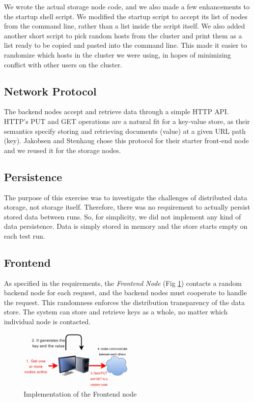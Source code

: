 \documentclass[11pt,conference]{IEEEtran}
\begin{document}
We wrote the actual storage node code, and we also made a few enhancements to
the startup shell script. We modified the startup script to accept its list of
nodes from the command line, rather than a list inside the script itself. We
also added another short script to pick random hosts from the cluster and print
them as a list ready to be copied and pasted into the command line. This made it
easier to randomize which hosts in the cluster we were using, in hopes of
minimizing conflict with other users on the cluster.


\subsection{Network Protocol}

The backend nodes accept and retrieve data through a simple HTTP API. HTTP's PUT
and GET operations are a natural fit for a key-value store, as their semantics
specify storing and retrieving documents (value) at a given URL path (key).
Jakobsen and Stenhaug chose this protocol for their starter front-end node and
we reused it for the storage nodes.


\subsection{Persistence}

The purpose of this exercise was to investigate the challenges of distributed
data storage, not storage itself. Therefore, there was no requirement to
actually persist stored data between runs. So, for simplicity, we did not
implement any kind of data persistence. Data is simply stored in memory and the
store starts empty on each test run.


\subsection{Frontend}

As specified in the requirements, the \textit{Frontend Node} (Fig
\ref{fig:frontend}) contacts a random backend node for each request, and the
backend nodes must cooperate to handle the request. This randomness enforces the
distribution transparency of the data store. The system can store and retrieve
keys as a whole, no matter which individual node is contacted.

\begin{figure}[h!]
  \centering
    \includegraphics[width=0.5\textwidth]{frontend}
    \caption{Implementation of the Frontend node}
    \label{fig:frontend}
\end{figure}
\end{document}
